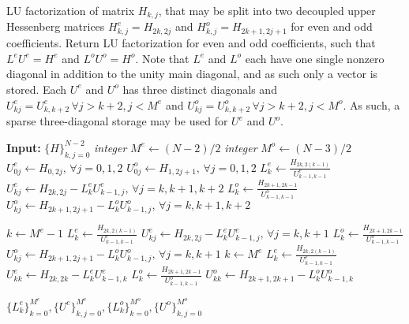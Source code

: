\documentclass[11pt, oneside]{article}
\begin{document}
\begin{algorithm}
\caption{LU factorization of matrix $H_{k,j}$, that may be split into two 
decoupled upper Hessenberg matrices $H^e_{k,j} = H_{2k,2j}$ and $H^o_{k,j} = 
H_{2k+1,2j+1}$ for even and odd coefficients. Return LU factorization for even 
and odd coefficients, such that $L^eU^e=H^e$ and $L^oU^o=H^o$. Note that 
$L^{e}$ and $L^{o}$ each have one single nonzero diagonal in addition to the 
unity main diagonal, and as such only a vector is stored. Each $U^{e}$ and 
$U^{o}$ has three distinct diagonals and $U^{e}_{kj}=U^{e}_{k, k+2} \,\forall 
j 
> k+2, j< M^e$ and $U^{o}_{kj}=U^{o}_{k, k+2} \,\forall j > k+2, j< M^o$. As 
such, a sparse three-diagonal storage may be used for $U^e$ and $U^o$.}
\label{alg:lu}
\begin{algorithmic}[1]
  \State \textbf{Input:} $\{H\}_{k,j=0}^{N-2}$
  \State \textit{integer} $M^e \gets (N-2)/2$
  \State \textit{integer} $M^o \gets (N-3)/2$
  \State ${U}^e_{0j} \gets {H}_{0,2j}, \, \forall j=0,1,2 $
  \State ${U}^o_{0j} \gets {H}_{1,2j+1}, \, \forall j=0,1,2 $
    \State ${L}^e_{k} \gets \frac{{H}_{2k,2(k-1)}}{{U}^e_{k-1,k-1}}$
    \State ${U}^e_{kj} \gets {H}_{2k,2j} - {L}^e_{k}{U}^e_{k-1,j}, \, \forall 
j=k, k+1, k+2$
    \State ${L}^o_{k} \gets \frac{{H}_{2k+1,2k-1}}{{U}^o_{k-1,k-1}}$
    \State ${U}^o_{kj} \gets {H}_{2k+1,2j+1} - {L}^o_{k}{U}^o_{k-1,j}, \, 
\forall j=k, k+1, k+2$
  \EndFor
  
  \State $k \gets M^e-1$
  \State ${L}^e_{k} \gets \frac{{H}_{2k,2(k-1)}}{{U}^e_{k-1,k-1}}$
  \State ${U}^e_{kj} \gets {H}_{2k,2j} - {L}^e_{k}{U}^e_{k-1,j}, \, \forall 
j=k, k+1$
  \State ${L}^o_{k} \gets \frac{{H}_{2k+1,2k-1}}{{U}^o_{k-1,k-1}}$
  \State ${U}^o_{kj} \gets {H}_{2k+1,2j+1} - {L}^o_{k}{U}^o_{k-1,j}, \, 
\forall j=k, k+1$
  \State $k \gets M^e$
  \State ${L}^e_{k} \gets \frac{{H}_{2k,2(k-1)}}{{U}^e_{k-1,k-1}}$
  \State ${U}^e_{kk} \gets {H}_{2k,2k} - {L}^e_{k}{U}^e_{k-1,k}$
    \State ${L}^o_{k} \gets \frac{{H}_{2k+1,2k-1}}{{U}^o_{k-1,k-1}}$
    \State ${U}^o_{kk} \gets {H}_{2k+1,2k+1} - {L}^o_{k}{U}^o_{k-1,k}$

  \EndIf  
  \State \Return $\{L^e_k\}_{k=0}^{M^e},\{U^e\}_{k,j=0}^{M^e}, 
\{L^o_k\}_{k=0}^{M^o},\{U^o\}_{k,j=0}^{M^o}$
\EndProcedure
\end{algorithmic}
\end{algorithm}
\end{document}
